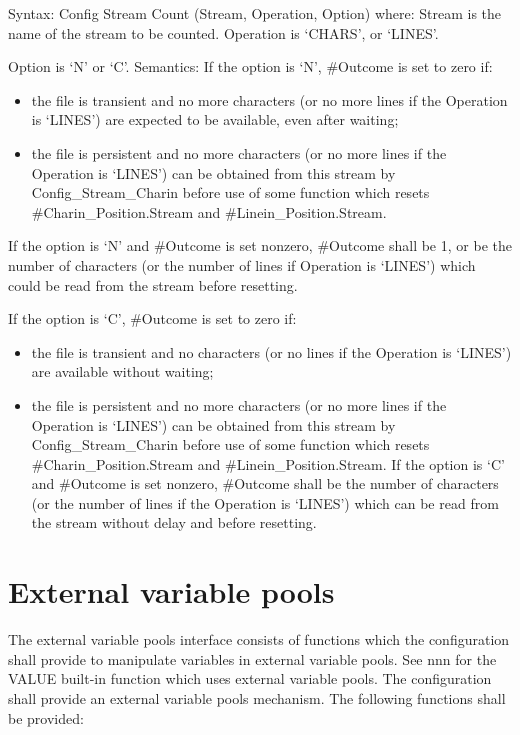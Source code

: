 Syntax: Config Stream Count (Stream, Operation, Option) where: Stream is
the name of the stream to be counted. Operation is `CHARS', or `LINES'.

Option is `N' or `C'. Semantics: If the option is `N', \#Outcome is set
to zero if:

\begin{itemize}
\item
  the file is transient and no more characters (or no more lines if the
  Operation is `LINES') are expected to be available, even after
  waiting;
\item
  the file is persistent and no more characters (or no more lines if the
  Operation is `LINES') can be obtained from this stream by
  Config\_Stream\_Charin before use of some function which resets
  \#Charin\_Position.Stream and \#Linein\_Position.Stream.
\end{itemize}

If the option is `N' and \#Outcome is set nonzero, \#Outcome shall be 1,
or be the number of characters (or the number of lines if Operation is
`LINES') which could be read from the stream before resetting.

If the option is `C', \#Outcome is set to zero if:

\begin{itemize}
\item
  the file is transient and no characters (or no lines if the Operation
  is `LINES') are available without waiting;
\item
  the file is persistent and no more characters (or no more lines if the
  Operation is `LINES') can be obtained from this stream by
  Config\_Stream\_Charin before use of some function which resets
  \#Charin\_Position.Stream and \#Linein\_Position.Stream. If the option
  is `C' and \#Outcome is set nonzero, \#Outcome shall be the number of
  characters (or the number of lines if the Operation is `LINES') which
  can be read from the stream without delay and before resetting.
\end{itemize}

\hypertarget{external-variable-pools}{%
\section{External variable pools}\label{external-variable-pools}}

The external variable pools interface consists of functions which the
configuration shall provide to manipulate variables in external variable
pools. See nnn for the VALUE built-in function which uses external
variable pools. The configuration shall provide an external variable
pools mechanism. The following functions shall be provided:

